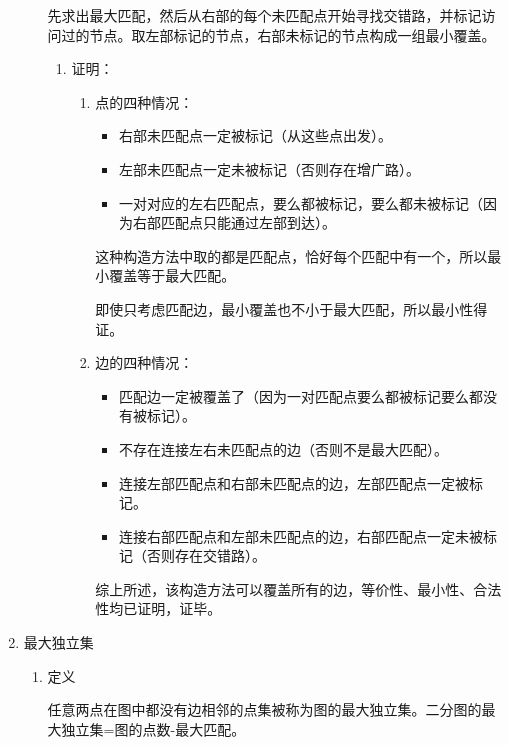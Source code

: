 \documentclass[11pt]{article}
\begin{document}
\begin{enumerate}
\begin{enumerate}
先求出最大匹配，然后从右部的每个未匹配点开始寻找交错路，并标记访问过的节点。取左部标记的节点，右部未标记的节点构成一组最小覆盖。

\begin{enumerate}
\item 证明：
\label{sec:org98b352c}

\begin{enumerate}
\item 点的四种情况：
\label{sec:orged4ba33}

\begin{itemize}
\item 右部未匹配点一定被标记（从这些点出发）。
\item 左部未匹配点一定未被标记（否则存在增广路）。
\item 一对对应的左右匹配点，要么都被标记，要么都未被标记（因为右部匹配点只能通过左部到达）。
\end{itemize}

这种构造方法中取的都是匹配点，恰好每个匹配中有一个，所以最小覆盖等于最大匹配。

即使只考虑匹配边，最小覆盖也不小于最大匹配，所以最小性得证。

\item 边的四种情况：
\label{sec:orgca45b51}

\begin{itemize}
\item 匹配边一定被覆盖了（因为一对匹配点要么都被标记要么都没有被标记）。
\item 不存在连接左右未匹配点的边（否则不是最大匹配）。
\item 连接左部匹配点和右部未匹配点的边，左部匹配点一定被标记。
\item 连接右部匹配点和左部未匹配点的边，右部匹配点一定未被标记（否则存在交错路）。
\end{itemize}

综上所述，该构造方法可以覆盖所有的边，等价性、最小性、合法性均已证明，证毕。
\end{enumerate}
\end{enumerate}
\end{enumerate}

\item 最大独立集
\label{sec:org0ee654a}

\begin{enumerate}
\item 定义
\label{sec:org999a831}

任意两点在图中都没有边相邻的点集被称为图的最大独立集。二分图的最大独立集=图的点数-最大匹配。


\end{enumerate}
\end{enumerate}
\end{document}

